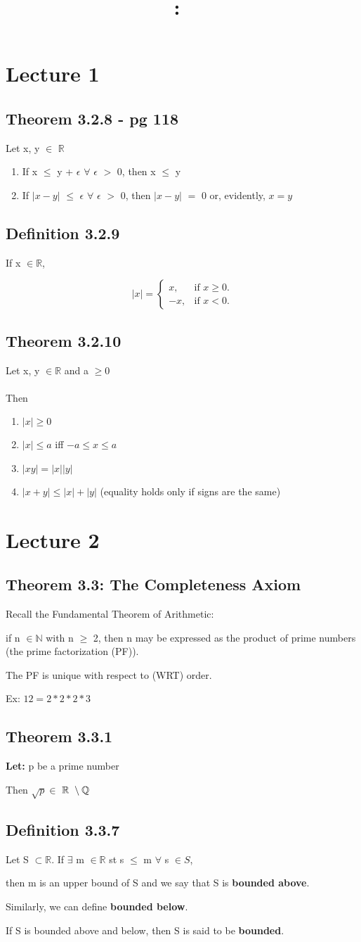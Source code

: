 \documentclass{article}
\title{
    \vspace{2in}
    \textmd{\textbf{\hmwkClass:\ \hmwkTitle}}\\
    \normalsize\vspace{0.1in}\small\vspace{0.1in}\large{\textit{\hmwkClassInstructor}}
    \vspace{3in}
}
\author{\hmwkAuthorName}
\date{}
\newcommand{\mt}[1]{\ensuremath{#1}}
\newcommand\bsc[2][\DefaultOpt]{%
  \def\DefaultOpt{#2}%
  \section[#1]{#2}%
}
\newcommand\ssc[2][\DefaultOpt]{%
  \def\DefaultOpt{#2}%
  \subsection[#1]{#2}%
}
\newcommand{\bgeq}{\begin{equation*}}
\newcommand{\eeq}{\end{equation*}}
\newcommand{\balist}{\begin{enumerate}[label=\alph*.]}
\newcommand{\elist}{\end{enumerate}}
\newcommand{\lt}[1]{\textbf{Let: } #1}
\newcommand{\br}{\mt{\mathbb{R}} }       %
\newcommand{\bq}{\mt{\mathbb{Q}} }       %
\newcommand{\bn}{\mt{\mathbb{N}} }       %
\newcommand{\ep}{\mt{\epsilon} }         %
\newcommand{\fa}{\mt{\forall} }          %
\newcommand{\sbs}{\mt{\subset} }         %
\newcommand{\bnt}[2]{\mt{\textrm{#1}\setminus{\textrm{#2}}}}
\begin{document}
\bsc{Lecture 1}{

\ssc{Theorem 3.2.8 - pg 118}{
Let x, y $\in$ $\mathbb{R}$

\balist
\item If x $\leq$ y + $\ep$ $\fa$ $\ep$ $>$ $0$, then x $\leq$ y
\item If $|x - y|$ $\leq$ $\ep$ $\fa$ $\ep$ $>$ $0$, then $|x - y|$ $=$ $0$ or, evidently, $x = y$
\elist

}

\ssc{Definition 3.2.9} {

If x $\in \br$,

\bgeq
  |x|=\begin{cases}
    x, & \text{if $x \geq 0$}.\\
    -x, & \text{if $x < 0$}.
  \end{cases}
\eeq
}

\ssc{Theorem 3.2.10} {
Let x, y $\in \br$ and a $\geq 0$ \\
\\
Then
\balist
\item $|x| \geq 0$
\item $|x| \leq a$ iff $-a \leq x \leq a$
\item $|xy| = |x||y|$
\item $|x + y| \leq |x| + |y|$ (equality holds only if signs are the same)
\elist
}

\newpage

\bsc{Lecture 2}{

\ssc{Theorem 3.3: The Completeness Axiom}{
Recall the Fundamental Theorem of Arithmetic: \

if n $\in \bn$ with n $\geq$ 2, then n may be expressed as the product of prime numbers (the prime factorization (PF)). \

The PF is unique with respect to (WRT) order. \

Ex: $12 = 2 * 2 * 2 * 3$
}

\ssc{Theorem 3.3.1}{
\lt{p be a prime number} \

Then $\sqrt{p} \in $ \bnt{\br}{\bq}
}

\ssc{Definition 3.3.7}{
Let S $\sbs \br$. If $\exists$ m $\in \br$ st s $\leq$ m $\fa$ s $\in S$, \

then m is an upper bound of S and we say that S is \textbf{bounded above}. \

Similarly, we can define \textbf{bounded below}. \

If S is bounded above and below, then S is said to be \textbf{bounded}.

}}}
\end{document}
